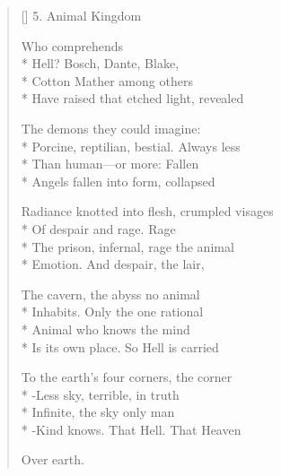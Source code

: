 \begin{verse}[\versewidth]
5. Animal Kingdom

                                  Who comprehends\\*
Hell? Bosch, Dante, Blake,\\*
Cotton Mather among others\\*
Have raised that etched light, revealed

The demons they could imagine:\\*
Porcine, reptilian, bestial. Always less\\*
Than human---or more: Fallen\\*
Angels fallen into form, collapsed

Radiance knotted into flesh, crumpled visages\\*
Of despair and rage. Rage\\*
The prison, infernal, rage the animal\\*
Emotion.  And despair, the lair,

The cavern, the abyss no animal\\*
Inhabits. Only the one rational \\*
Animal who knows the mind\\*
Is its own place.   So Hell is carried

To the earth's four corners, the corner\\*
-Less sky, terrible, in truth\\*
Infinite, the sky only man\\*
-Kind knows. That Hell. That Heaven

Over earth.
\end{verse}

